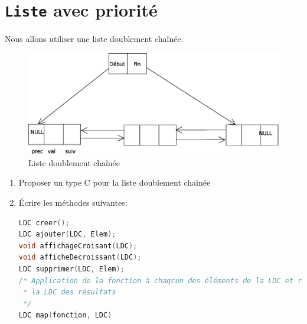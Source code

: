 \section{\texttt{Liste} avec priorité}
Nous allons utiliser une liste doublement chaînée.
\begin{figure}[H]
	\centering
\includegraphics[width=12cm]{content/fileDoubleChaine.eps}
	\caption{Liste doublement chaînée}
\end{figure}

\begin{enumerate}
	\item Proposer un type C pour la liste doublement chainée
	\item \'Ecrire les méthodes suivantes:  \\
\begin{lstlisting}[language=C, numbers=none]
LDC creer();
LDC ajouter(LDC, Elem);
void affichageCroisant(LDC);
void afficheDecroissant(LDC);
LDC supprimer(LDC, Elem);
/* Application de la fonction à chaqcun des éléments de la LDC et renvoie
 * la LDC des résultats 
 */
LDC map(fonction, LDC) 
\end{lstlisting}
\end{enumerate}


